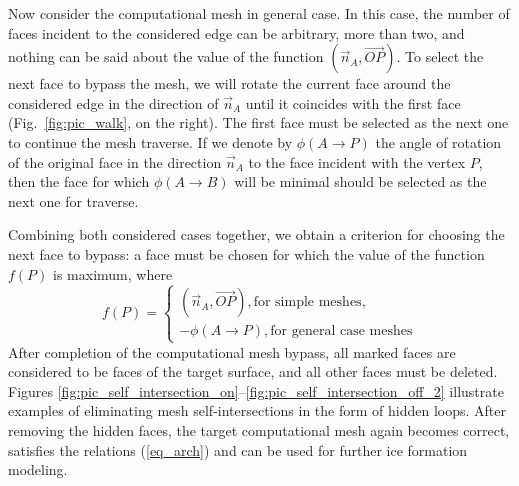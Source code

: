 Now consider the computational mesh in general case.
In this case, the number of faces incident to the considered edge can be arbitrary, more than two, and nothing can be said about the value of the function $(\vec{n}_A, \vec{OP})$.
To select the next face to bypass the mesh, we will rotate the current face around the considered edge in the direction of $\vec{n}_A$ until it coincides with the first face (Fig.~\ref{fig:pic_walk}, on the right).
The first face must be selected as the next one to continue the mesh traverse.
If we denote by $\phi(A \rightarrow P)$ the angle of rotation of the original face in the direction $\vec{n}_A$ to the face incident with the vertex $P$, then the face for which $\phi(A \rightarrow B)$ will be minimal should be selected as the next one for traverse.

Combining both considered cases together, we obtain  a criterion for
choosing the next face to bypass: a face must be chosen for which
the value of the function $f(P)$ is maximum, where
\begin{equation*}
f(P) =
\begin{cases}
(\vec{n}_A, \vec{OP}), \text{for simple meshes}, \\
-\phi(A \rightarrow P), \text{for general case meshes}
\end{cases}
\end{equation*}
After completion of the computational mesh bypass, all marked faces are considered to be faces of the target surface, and all other faces must be deleted.
Figures
\ref{fig:pic_self_intersection_on}--\ref{fig:pic_self_intersection_off_2}
illustrate examples of eliminating mesh self-intersections in the
form of hidden loops.
After removing the hidden faces, the target computational mesh again becomes correct, satisfies the relations (\ref{eq_arch}) and can be used for further ice formation modeling.
